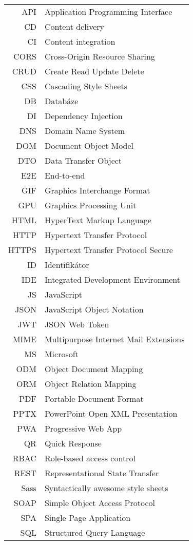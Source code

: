 \begin{longtable}{rl}
API & Application Programming Interface\\
CD & Content delivery\\
CI & Content integration\\
CORS & Cross-Origin Resource Sharing\\
CRUD & Create Read Update Delete\\
CSS & Cascading Style Sheets\\
DB & Databáze\\
DI & Dependency Injection\\
DNS & Domain Name System\\
DOM & Document Object Model\\
DTO & Data Transfer Object\\
E2E & End-to-end\\
GIF & Graphics Interchange Format\\
GPU & Graphics Processing Unit\\
HTML & HyperText Markup Language\\
HTTP & Hypertext Transfer Protocol\\
HTTPS & Hypertext Transfer Protocol Secure\\
ID & Identifikátor\\
IDE & Integrated Development Environment\\
JS & JavaScript\\
JSON & JavaScript Object Notation\\
JWT & JSON Web Token\\
MIME & Multipurpose Internet Mail Extensions\\
MS & Microsoft\\
ODM & Object Document Mapping\\
ORM & Object Relation Mapping\\
PDF & Portable Document Format\\
PPTX & PowerPoint Open XML Presentation\\
PWA & Progressive Web App\\
QR & Quick Response\\
RBAC & Role-based access control\\
REST & Representational State Transfer\\
Sass & Syntactically awesome style sheets\\
SOAP & Simple Object Access Protocol\\
SPA & Single Page Application\\
SQL & Structured Query Language\\

\end{longtable}
